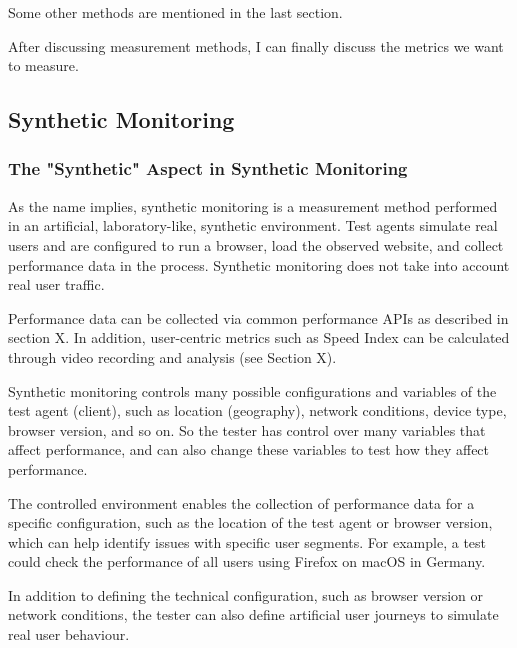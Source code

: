 Some other methods are mentioned in the last section.

After discussing measurement methods, I can finally discuss the metrics we want to measure.






\subsection{Synthetic Monitoring}
\label{subsection:synthetic_monitoring}


\subsubsection{The "Synthetic" Aspect in Synthetic Monitoring} %

As the name implies, synthetic monitoring is a measurement method performed in an artificial, laboratory-like, synthetic environment.
Test agents simulate real users and are configured to run a browser, load the observed website, and collect performance data in the process.
Synthetic monitoring does not take into account real user traffic. %

Performance data can be collected via common performance APIs as described in section X.
In addition, user-centric metrics such as Speed Index can be calculated through video recording and analysis (see Section X). %

Synthetic monitoring controls many possible configurations and variables of the test agent (client), such as location (geography), network conditions, device type, browser version, and so on. %
So the tester has control over many variables that affect performance, and can also change these variables to test how they affect performance.

The controlled environment enables the collection of performance data for a specific configuration, such as the location of the test agent or browser version, which can help identify issues with specific user segments.
For example, a test could check the performance of all users using Firefox on macOS in Germany. %

In addition to defining the technical configuration, such as browser version or network conditions, the tester can also define artificial user journeys to simulate real user behaviour. %

